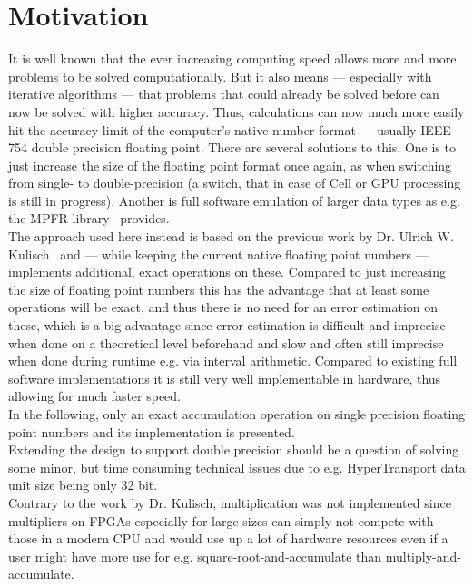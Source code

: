 
\chapter{Motivation}
It is well known that the ever increasing computing speed allows more
and more problems to be solved computationally.
But it also means --- especially with iterative algorithms --- that problems
that could already be solved before can now be solved with higher accuracy.
Thus, calculations can now much more easily hit the accuracy limit of the
computer's native number format --- usually IEEE 754 double precision floating
point.
There are several solutions to this. One is to just increase the size of the
floating point format once again, as when switching from single- to
double-precision (a switch, that in case of Cell or GPU processing is still in
progress).
Another is full software emulation of larger data types as e.g. the
MPFR library~\cite{mpfr} provides.\\
The approach used here instead is based on the previous work by
Dr. Ulrich W. Kulisch~\cite{advar} and --- while keeping the current native
floating point numbers --- implements additional, exact operations on these.
Compared to just increasing the size of floating point numbers this has the
advantage that at least some operations will be exact, and thus there is no
need for an error estimation on these, which is a big advantage since error
estimation is difficult and imprecise when done on a theoretical level
beforehand and slow and often still imprecise when done during runtime e.g.
via interval arithmetic.
Compared to existing full software implementations it is still very well implementable
in hardware, thus allowing for much faster speed.\\
In the following, only an exact accumulation operation on single precision floating
point numbers and its implementation is presented.\\
Extending the design to support double precision should be a question of solving
some minor, but time consuming technical issues due to e.g. HyperTransport data
unit size being only 32 bit.\\
Contrary to the work by Dr. Kulisch, multiplication was not implemented since
multipliers on FPGAs especially for large sizes can simply not compete with
those in a modern CPU and would use up a lot of hardware resources even if
a user might have more use for e.g. square-root-and-accumulate than
multiply-and-accumulate.

